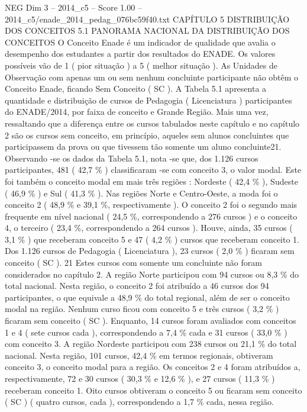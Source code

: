 \begin{textsample}{NEG Dim 3 – 2014\_c5 – Score 1.00 – 2014\_c5/enade\_2014\_pedag\_076bc59f40.txt}  \label{ex:f3_neg_065}
CAPÍTULO 5 DISTRIBUIÇÃO DOS CONCEITOS 5.1 PANORAMA NACIONAL DA DISTRIBUIÇÃO DOS CONCEITOS O Conceito Enade é um indicador de qualidade que avalia o desempenho dos estudantes a partir dos resultados do ENADE.
Os valores possíveis vão de 1 ( pior situação ) a 5 ( melhor situação ).
As Unidades de Observação com apenas um ou sem nenhum concluinte participante não obtêm o Conceito Enade, ficando Sem Conceito ( SC ).
A Tabela 5.1 apresenta a quantidade e distribuição de cursos de Pedagogia ( Licenciatura ) participantes do ENADE/2014, por faixa de conceito e Grande Região.
Mais uma vez, ressaltando que a diferença entre os cursos tabulados neste capítulo e no capítulo 2 são os cursos sem conceito, em princípio, aqueles sem alunos concluintes que participassem da prova ou que tivessem tão somente um aluno concluinte21.
Observando -se os dados da Tabela 5.1, nota -se que, dos 1.126 cursos participantes, 481 ( 42,7 \% ) classificaram -se com conceito 3, o valor modal.
Este foi também o conceito modal em mais três regiões : Nordeste ( 42,4 \% ), Sudeste ( 46,9 \% ) e Sul ( 41,3 \% ).
Nas regiões Norte e Centro-Oeste, a moda foi o conceito 2 ( 48,9 \% e 39,1 \%, respectivamente ).
O conceito 2 foi o segundo mais frequente em nível nacional ( 24,5 \%, correspondendo a 276 cursos ) e o conceito 4, o terceiro ( 23,4 \%, correspondendo a 264 cursos ).
Houve, ainda, 35 cursos ( 3,1 \% ) que receberam conceito 5 e 47 ( 4,2 \% ) cursos que receberam conceito 1.
Dos 1.126 cursos de Pedagogia ( Licenciatura ), 23 cursos ( 2,0 \% ) ficaram sem conceito ( SC ). 21 Estes cursos com somente um concluinte não foram considerados no capítulo 2.
A região Norte participou com 94 cursos ou 8,3 \% do total nacional.
Nesta região, o conceito 2 foi atribuído a 46 cursos dos 94 participantes, o que equivale a 48,9 \% do total regional, além de ser o conceito modal na região.
Nenhum curso ficou com conceito 5 e três cursos ( 3,2 \% ) ficaram sem conceito ( SC ).
Enquanto, 14 cursos foram avaliados com conceitos 1 e 4 ( sete cursos cada ), correspondendo a 7,4 \% cada e 31 cursos ( 33,0 \% ) com conceito 3.
A região Nordeste participou com 238 cursos ou 21,1 \% do total nacional.
Nesta região, 101 cursos, 42,4 \% em termos regionais, obtiveram conceito 3, o conceito modal para a região.
Os conceitos 2 e 4 foram atribuídos a, respectivamente, 72 e 30 cursos ( 30,3 \% e 12,6 \% ), e 27 cursos ( 11,3 \% ) receberam conceito 1.
Oito cursos obtiveram o conceito 5 ou ficaram sem conceito ( SC ) ( quatro cursos, cada ), correspondendo a 1,7 \% cada, nessa região.

\end{textsample}
